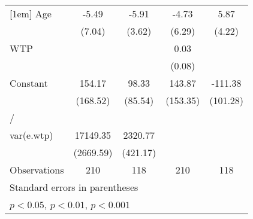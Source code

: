 \begin{table}[htbp]
\begin{tabular}{l*{4}{c}}
[1em]
Age                 &       -5.49         &       -5.91         &       -4.73         &        5.87         \\
                    &      (7.04)         &      (3.62)         &      (6.29)         &      (4.22)         \\
[1em]
WTP                 &                     &                     &        0.03         &                     \\
                    &                     &                     &      (0.08)         &                     \\
[1em]
Constant            &      154.17         &       98.33         &      143.87         &     -111.38         \\
                    &    (168.52)         &     (85.54)         &    (153.35)         &    (101.28)         \\
\hline
/                   &                     &                     &                     &                     \\
var(e.wtp)          &    17149.35\sym{***}&     2320.77\sym{***}&                     &                     \\
                    &   (2669.59)         &    (421.17)         &                     &                     \\
\hline
Observations        &         210         &         118         &         210         &         118         \\
\hline\hline
\multicolumn{5}{l}{\footnotesize Standard errors in parentheses}\\
\multicolumn{5}{l}{\footnotesize \sym{*} \(p<0.05\), \sym{**} \(p<0.01\), \sym{***} \(p<0.001\)}\\
\end{tabular}
\end{table}
